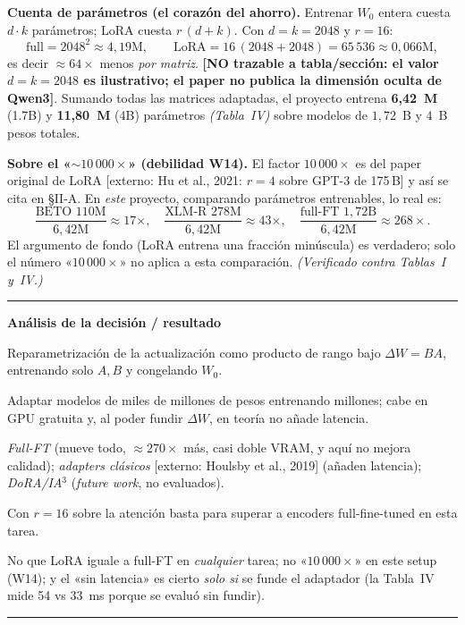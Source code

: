 \documentclass[11pt,a4paper]{article}
\newcommand{\externo}[1]{{\footnotesize\textcolor{red!55!black}{[externo: #1]}}}
\newcommand{\notrace}[1]{{\footnotesize\textcolor{orange!75!black}{\textbf{[NO trazable a tabla/sección: #1]}}}}
\newenvironment{analisis}{%
  \medskip\par\noindent\rule{\linewidth}{0.4pt}\par\nopagebreak
  \textbf{Análisis de la decisión / resultado}\par\nopagebreak\smallskip
  \begin{description}[leftmargin=2.6cm,style=nextline,font=\bfseries]
}{%
  \end{description}\noindent\rule{\linewidth}{0.4pt}\par\medskip
}
\begin{document}
\noindent\textbf{Cuenta de parámetros (el corazón del ahorro).} Entrenar $W_0$ entera cuesta
$d\cdot k$ parámetros; LoRA cuesta $r\,(d+k)$. Con $d=k=2048$ y $r=16$:
\[
\text{full} = 2048^2 \approx 4{,}19\text{M}, \qquad \text{LoRA} = 16\,(2048{+}2048) = 65\,536 \approx 0{,}066\text{M},
\]
es decir $\approx 64\times$ menos \emph{por matriz}.
\notrace{el valor $d=k=2048$ es ilustrativo; el paper no publica la dimensión oculta de Qwen3}.
Sumando todas las matrices adaptadas, el proyecto entrena \textbf{6,42~M} (1.7B) y \textbf{11,80~M}
(4B) parámetros \emph{(Tabla~IV)} sobre modelos de $1{,}72$~B y $4$~B pesos totales.

\medskip\noindent\textbf{Sobre el «$\sim\!10\,000\times$» (debilidad W14).} El factor $10\,000\times$
es del paper original de LoRA \externo{Hu et al., 2021: $r{=}4$ sobre GPT-3 de 175\,B} y así se cita
en \S II-A. En \emph{este} proyecto, comparando parámetros entrenables, lo real es:
\[
\frac{\text{BETO }110\text{M}}{6{,}42\text{M}} \approx 17\times,\quad
\frac{\text{XLM-R }278\text{M}}{6{,}42\text{M}} \approx 43\times,\quad
\frac{\text{full-FT }1{,}72\text{B}}{6{,}42\text{M}} \approx 268\times .
\]
El argumento de fondo (LoRA entrena una fracción minúscula) es verdadero; solo el número
«$10\,000\times$» no aplica a esta comparación. \emph{(Verificado contra Tablas~I y~IV.)}

\begin{analisis}
  \item[Qué] Reparametrización de la actualización como producto de rango bajo $\Delta W=BA$,
        entrenando solo $A,B$ y congelando $W_0$.
  \item[Por qué] Adaptar modelos de miles de millones de pesos entrenando millones; cabe en GPU
        gratuita y, al poder fundir $\Delta W$, en teoría no añade latencia.
  \item[Alternativas descartadas] \emph{Full-FT} (mueve todo, $\approx 270\times$ más, casi doble
        VRAM, y aquí no mejora calidad); \emph{adapters clásicos} \externo{Houlsby et al., 2019}
        (añaden latencia); \emph{DoRA/IA$^3$} (\emph{future work}, no evaluados).
  \item[Qué significa] Con $r=16$ sobre la atención basta para superar a encoders full-fine-tuned
        en esta tarea.
  \item[Qué NO significa] No que LoRA iguale a full-FT en \emph{cualquier} tarea; no
        «$10\,000\times$» en este setup (W14); y el «sin latencia» es cierto \emph{solo si} se funde
        el adaptador (la Tabla~IV mide 54 vs 33~ms porque se evaluó sin fundir).
\end{analisis}
\end{document}

